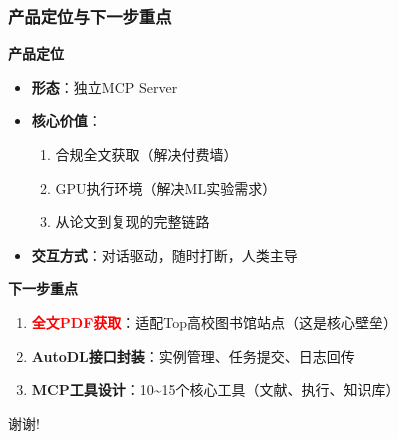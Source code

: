\documentclass[
  aspectratio=169,
  presentation,
  titlegraphic=./images/bit_logo.pdf,
  framelogo=./images/bit_logo.pdf
]{bitbeamer}
\begin{document}
\begin{frame}[t]
  \frametitle{产品定位与下一步重点}

  \textbf{产品定位}
  \begin{itemize}
    \item \textbf{形态}：独立MCP Server
    \item \textbf{核心价值}：
    \begin{enumerate}
      \item 合规全文获取（解决付费墙）
      \item GPU执行环境（解决ML实验需求）
      \item 从论文到复现的完整链路
    \end{enumerate}
    \item \textbf{交互方式}：对话驱动，随时打断，人类主导
  \end{itemize}

  \vspace{0.5cm}

  \textbf{下一步重点}
  \begin{enumerate}
    \item \textcolor{red}{\textbf{全文PDF获取}}：适配Top高校图书馆站点（这是核心壁垒）
    \item \textbf{AutoDL接口封装}：实例管理、任务提交、日志回传
    \item \textbf{MCP工具设计}：10\textasciitilde15个核心工具（文献、执行、知识库）
  \end{enumerate}

\end{frame}

\begin{frame}[c]

  谢谢!

\end{frame}
\end{document}
